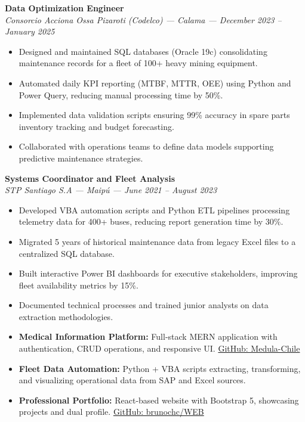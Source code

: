 \documentclass[10pt,letterpaper]{article}
\begin{document}
\vspace{0.2cm}

\noindent \textbf{Data Optimization Engineer} \\
\textit{Consorcio Acciona Ossa Pizaroti (Codelco) — Calama — December 2023 – January 2025}
\begin{itemize}
    \item Designed and maintained SQL databases (Oracle 19c) consolidating maintenance records for a fleet of 100+ heavy mining equipment.
    \item Automated daily KPI reporting (MTBF, MTTR, OEE) using Python and Power Query, reducing manual processing time by 50\%.
    \item Implemented data validation scripts ensuring 99\% accuracy in spare parts inventory tracking and budget forecasting.
    \item Collaborated with operations teams to define data models supporting predictive maintenance strategies.
\end{itemize}

\vspace{0.2cm}

\noindent \textbf{Systems Coordinator and Fleet Analysis} \\
\textit{STP Santiago S.A — Maipú — June 2021 – August 2023}
\begin{itemize}
    \item Developed VBA automation scripts and Python ETL pipelines processing telemetry data for 400+ buses, reducing report generation time by 30\%.
    \item Migrated 5 years of historical maintenance data from legacy Excel files to a centralized SQL database.
    \item Built interactive Power BI dashboards for executive stakeholders, improving fleet availability metrics by 15\%.
    \item Documented technical processes and trained junior analysts on data extraction methodologies.
\end{itemize}

\vspace{0.4cm}


\vspace{0.3cm}

\begin{itemize}
    \item \textbf{Medical Information Platform:} Full-stack MERN application with authentication, CRUD operations, and responsive UI. \href{https://github.com/Medula-Chile}{GitHub: Medula-Chile}
    \item \textbf{Fleet Data Automation:} Python + VBA scripts extracting, transforming, and visualizing operational data from SAP and Excel sources.
    \item \textbf{Professional Portfolio:} React-based website with Bootstrap 5, showcasing projects and dual profile. \href{https://github.com/brunochc/WEB}{GitHub: brunochc/WEB}
\end{itemize}
\end{document}
